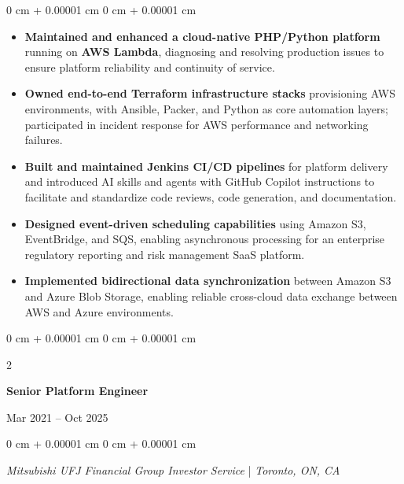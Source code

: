 \documentclass[11pt, letterpaper]{article}
\newenvironment{highlights}{
\begin{itemize}[
topsep=0.10 cm,
parsep=0.10 cm,
partopsep=0pt,
itemsep=0pt,
leftmargin=0 cm + 20pt
]
}{
\end{itemize}
} %
\newenvironment{onecolentry}{
\begin{adjustwidth}{
0 cm + 0.00001 cm
}{
0 cm + 0.00001 cm
}
}{
\end{adjustwidth}
} %
\newenvironment{twocolentry}[2][]{
\onecolentry
\def\secondColumn{#2}
\setcolumnwidth{\fill, 4.5 cm}
\begin{paracol}{2}
}{
\switchcolumn \raggedleft \secondColumn
\end{paracol}
\endonecolentry
} %
\begin{document}
\vspace{0.10 cm}
\begin{onecolentry}
\begin{highlights}
\item \textbf{Maintained and enhanced a cloud-native PHP/Python platform} running on \textbf{AWS Lambda}, diagnosing and resolving production issues to ensure platform reliability and continuity of service.

\item \textbf{Owned end-to-end Terraform infrastructure stacks} provisioning AWS environments, with Ansible, Packer, and Python as core automation layers; participated in incident response for AWS performance and networking failures.

\item \textbf{Built and maintained Jenkins CI/CD pipelines} for platform delivery and introduced AI skills and agents with GitHub Copilot instructions to facilitate and standardize code reviews, code generation, and documentation.

\item \textbf{Designed event-driven scheduling capabilities} using Amazon S3, EventBridge, and SQS, enabling asynchronous processing for an enterprise regulatory reporting and risk management SaaS platform.

\item \textbf{Implemented bidirectional data synchronization} between Amazon S3 and Azure Blob Storage, enabling reliable cross-cloud data exchange between AWS and Azure environments.
\end{highlights}
\end{onecolentry}

\vspace{0.2 cm}

\begin{twocolentry}{
Mar 2021 – Oct 2025
}
\textbf{Senior Platform Engineer}
\end{twocolentry}

\begin{onecolentry}
\textit{Mitsubishi UFJ Financial Group Investor Service} | \textit{Toronto, ON, CA}
\end{onecolentry}
\end{document}
